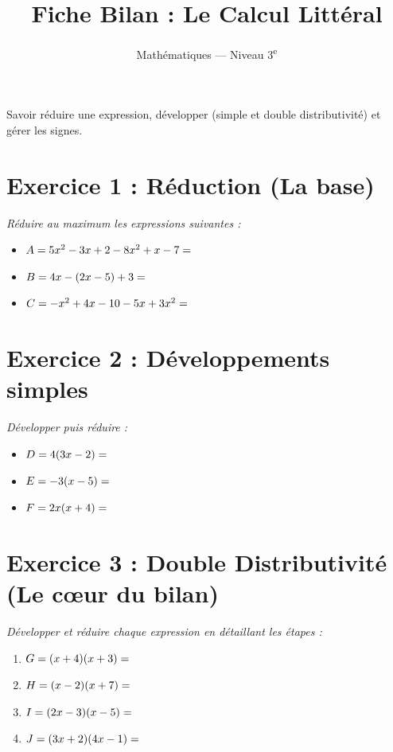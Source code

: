 \documentclass[11pt,a4paper]{article}
\title{\textbf{Fiche Bilan : Le Calcul Littéral}}
\author{Mathématiques --- Niveau 3\textsuperscript{e}}
\begin{document}
\maketitle

\begin{tcolorbox}[colback=red!5!white,colframe=red!75!black,title=Objectifs du Recto]
Savoir réduire une expression, développer (simple et double distributivité) et gérer les signes.
\end{tcolorbox}

\section*{Exercice 1 : Réduction (La base)}
\textit{Réduire au maximum les expressions suivantes :}
\begin{itemize}[label=\textbullet]
    \item $A = 5x^2 - 3x + 2 - 8x^2 + x - 7 = \dotfill$
    \item $B = 4x - (2x - 5) + 3 = \dotfill$
    \item $C = -x^2 + 4x - 10 - 5x + 3x^2 = \dotfill$
\end{itemize}

\section*{Exercice 2 : Développements simples}
\textit{Développer puis réduire :}
\begin{itemize}[label=\textbullet]
    \item $D = 4(3x - 2) = \dotfill$
    \item $E = -3(x - 5) = \dotfill$
    \item $F = 2x(x + 4) = \dotfill$
\end{itemize}

\section*{Exercice 3 : Double Distributivité (Le cœur du bilan)}
\textit{Développer et réduire chaque expression en détaillant les étapes :}
\begin{enumerate}
    \item $G = (x + 4)(x + 3) = \dotfill$
    \item $H = (x - 2)(x + 7) = \dotfill$
    \item $I = (2x - 3)(x - 5) = \dotfill$
    \item $J = (3x + 2)(4x - 1) = \dotfill$
\end{enumerate}
\end{document}
